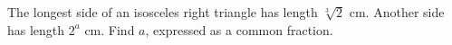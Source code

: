 The longest side of an isosceles right triangle has length $\sqrt[3]{2}$ cm. Another side has length $2^a$ cm. Find $a$, expressed as a common fraction.
